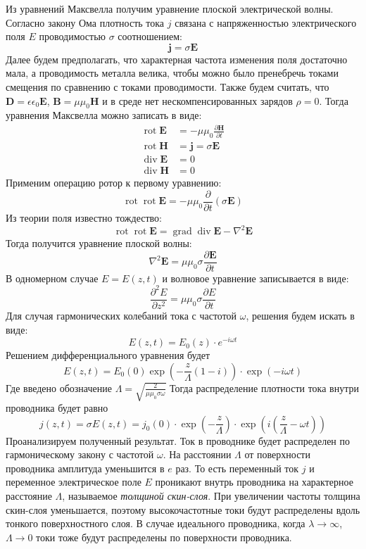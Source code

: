 Из уравнений Максвелла получим уравнение плоской электрической волны. Согласно закону Ома плотность тока $j$ связана с напряженностью электрического поля $E$ проводимостью $\sigma$ соотношением:
$$
\pmb{j} = \sigma \pmb {E}
$$
Далее будем предполагать, что характерная частота изменения поля достаточно мала, а проводимость металла велика, чтобы можно было пренебречь токами смещения по сравнению с токами проводимости. Также будем считать, что $\pmb{D} = \epsilon \epsilon_0 \pmb{E}$, $\pmb{B} = \mu \mu_0 \pmb{H}$ и в среде нет нескомпенсированных зарядов $\rho = 0$. Тогда уравнения Максвелла можно записать в виде:
\begin{equation*}
	\begin{split}
		\operatorname{rot} \pmb{E} &= -\mu \mu_0 \frac{\partial \pmb{H}}{\partial t} \\
		\operatorname{rot} \pmb{H} &= \pmb{j} = \sigma \pmb{E} \\
		\operatorname{div} \pmb{E} &= 0 \\
		\operatorname{div} \pmb{H} &= 0
	\end{split}
\end{equation*}
Применим операцию ротор к первому уравнению:
$$
\operatorname{rot} \operatorname{rot} \pmb{E} = - \mu \mu_0  \frac{\partial}{\partial t} \left( \sigma \pmb{E} \right)
$$
Из теории поля известно тождество:
$$
\operatorname{rot} \operatorname{rot} \pmb{E} = \operatorname{grad} \operatorname{div} \pmb{E} - \nabla^2 \pmb{E}
$$
Тогда получится уравнение плоской волны:
$$
\nabla^2 \pmb{E} = \mu \mu_0 \sigma \frac{\partial \pmb{E}}{\partial t}
$$
В одномерном случае $E = E(z, t)$ и волновое уравнение записывается в виде:
$$
\frac{\partial^2 E}{\partial z^2} = \mu \mu_0 \sigma \frac{\partial E}{\partial t}
$$
Для случая гармонических колебаний тока с частотой $\omega$, решения будем искать в виде:
$$
E(z, t) = E_0(z) \cdot e^{-i \omega t}
$$
Решением дифференциального уравнения будет
$$
E(z, t) = E_0(0) \exp{ \left( -\frac{z}{\Lambda} (1 - i) \right) }  \cdot \exp{ \left( -i \omega t \right) }
$$
Где введено обозначение $\Lambda = \sqrt{\frac{2}{\mu \mu_0 \sigma \omega}}$
Тогда распределение плотности тока внутри проводника будет равно
$$
j(z, t) = \sigma E(z, t) = j_0(0) \cdot \exp{ \left( -\frac{z}{\Lambda} \right)} \cdot \exp { \left( i \left(\frac{z}{ \Lambda} - \omega t \right) \right) }
$$
Проанализируем полученный результат. Ток в проводнике будет распределен по гармоническому закону с частотой $\omega$. На расстоянии $\Lambda$ от поверхности проводника амплитуда уменьшится в $e$ раз. То есть переменный ток $j$ и переменное электрическое поле $E$ проникают внутрь проводника на характерное расстояние $\Lambda$, называемое \textit{толщиной скин-слоя}. При увеличении частоты толщина скин-слоя уменьшается, поэтому высокочастотные токи будут распределены вдоль тонкого поверхностного слоя. В случае идеального проводника, когда $\lambda \rightarrow \infty$, $\Lambda \rightarrow 0$ токи тоже будут распределены по поверхности проводника.

